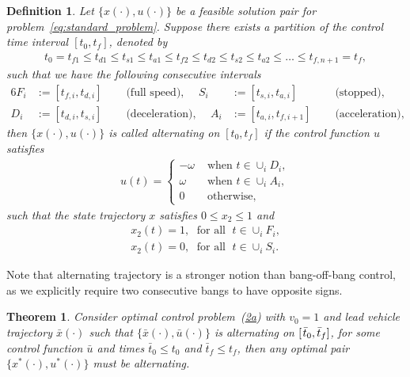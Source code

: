 \documentclass[a4paper]{article}
\theoremstyle{definition}
\theoremstyle{plain}
\newtheorem{define}{Definition\hspace{0.25em}\ignorespaces}
\newtheorem{theorem}{Theorem\hspace{0.25em}\ignorespaces}
\begin{document}
\begin{define}
  Let $\{x(\cdot), u(\cdot)\}$ be a feasible solution pair for problem~\eqref{eq:standard_problem}. Suppose there
  exists a partition of the control time interval $[t_{0}, t_{f}]$, denoted by
  \begin{align*}
    t_{0} = t_{f1} \leq t_{d1} \leq t_{s1} \leq t_{a1} \leq t_{f2} \leq t_{d2} \leq t_{s2} \leq t_{a2} \leq \dots \leq t_{f,n+1} = t_{f},
  \end{align*}
  such that we have the following consecutive intervals
  \begin{alignat*}{6}
    F_{i} &:= [t_{f,i}, t_{d,i}] \quad &\text{ (full speed), } \quad
    S_{i} &:= [t_{s,i}, t_{a,i}] \quad &\text{ (stopped), } \\
    D_{i} &:= [t_{d,i}, t_{s,i}] \quad &\text{ (deceleration), } \quad
    A_{i} &:= [t_{a,i}, t_{f,i+1}] \quad  &\text{ (acceleration), }
  \end{alignat*}
  then $\{x(\cdot), u(\cdot)\}$ is called \emph{alternating on $[t_{0}, t_{f}]$}
  if the control function $u$ satisfies
  \begin{align*}
    u(t) = \begin{cases}
             -\omega & \text{ when } t \in \cup_{i} D_{i}, \\
             \omega & \text{ when } t \in \cup_{i} A_{i}, \\
             0      & \text{ otherwise, }
           \end{cases}
  \end{align*}
  such that the state trajectory $x$ satisfies $0 \leq x_{2} \leq 1$ and
  \begin{align*}
    x_{2}(t) = 1, \; \text{ for all } \; t \in \cup_{i} F_{i} , \\
    x_{2}(t) = 0, \; \text{ for all } \; t \in \cup_{i} S_{i} .
  \end{align*}
\end{define}

Note that alternating trajectory is a stronger notion than bang-off-bang
control, as we explicitly require two consecutive bangs to have opposite signs.


\begin{theorem}\label{thm:optimal_control}
  Consider optimal control problem~{\normalfont (\hyperref[eq:setting]{2a})}
  with $v_{0} = 1$ and lead vehicle trajectory $\bar{x}(\cdot)$ such that
  $\{\bar{x}(\cdot), \bar{u}(\cdot)\}$ is alternating on $[\hspace{0.1em}\bar{t}_{0}, \bar{t}_{f}]$, for
  some control function $\bar{u}$ and times $\bar{t}_{0} \leq t_{0}$ and
  $\bar{t}_{f} \leq t_{f}$, then any optimal pair $\{x^{*}(\cdot), u^{*}(\cdot)\}$ must be
  alternating.
\end{theorem}
\end{document}
